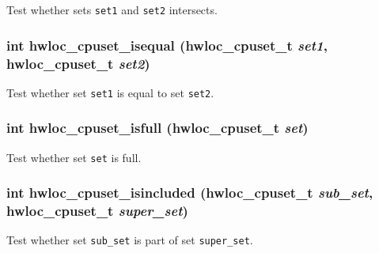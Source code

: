 Test whether sets {\tt set1} and {\tt set2} intersects. 

\hypertarget{group__hwlocality__cpuset_g15b36a71a420aab67d99fdaf44a022b1}{
\subsubsection[{hwloc\_\-cpuset\_\-isequal}]{\setlength{\rightskip}{0pt plus 5cm}int hwloc\_\-cpuset\_\-isequal ({\bf hwloc\_\-cpuset\_\-t} {\em set1}, \/  {\bf hwloc\_\-cpuset\_\-t} {\em set2})}}
\label{group__hwlocality__cpuset_g15b36a71a420aab67d99fdaf44a022b1}


Test whether set {\tt set1} is equal to set {\tt set2}. 

\hypertarget{group__hwlocality__cpuset_g125297097b53bedec7919651ab83609e}{
\subsubsection[{hwloc\_\-cpuset\_\-isfull}]{\setlength{\rightskip}{0pt plus 5cm}int hwloc\_\-cpuset\_\-isfull ({\bf hwloc\_\-cpuset\_\-t} {\em set})}}
\label{group__hwlocality__cpuset_g125297097b53bedec7919651ab83609e}


Test whether set {\tt set} is full. 

\hypertarget{group__hwlocality__cpuset_g82c079bdbed518fd175e71bac20223b1}{
\subsubsection[{hwloc\_\-cpuset\_\-isincluded}]{\setlength{\rightskip}{0pt plus 5cm}int hwloc\_\-cpuset\_\-isincluded ({\bf hwloc\_\-cpuset\_\-t} {\em sub\_\-set}, \/  {\bf hwloc\_\-cpuset\_\-t} {\em super\_\-set})}}
\label{group__hwlocality__cpuset_g82c079bdbed518fd175e71bac20223b1}


Test whether set {\tt sub\_\-set} is part of set {\tt super\_\-set}. 

